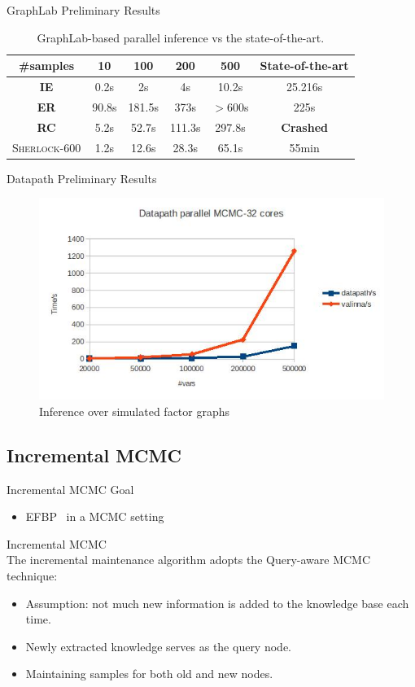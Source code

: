 \documentclass[onlymath,xcolor=pdftex,dvipsnames,table]{beamer}
\newcommand{\sherlock}{\textsc{Sherlock}\xspace}
\newcommand{\head}[1]{{\large\color{OliveGreen}#1\\[2pt]}}
\begin{document}
\begin{frame}{GraphLab Preliminary Results}
\begin{table}
  \centering
  \begin{tabular}{|cccccc|}\hline
    \textbf{\#samples} & 10 & 100 & 200 & 500 & State-of-the-art\\
    \hline
    \textbf{IE}   & 0.2s & 2s & 4s & 10.2s & 25.216s  \\
    \textbf{ER}   & 90.8s & 181.5s & 373s & $>$600s & 225s \\
    \textbf{RC}   & 5.2s & 52.7s & 111.3s & 297.8s & \textbf{\color{Red}Crashed} \\
    \sherlock-600 & 1.2s & 12.6s & 28.3s & 65.1s & 55min \\
    \hline
  \end{tabular}
  \caption{GraphLab-based parallel inference vs the state-of-the-art.}
\end{table}
\end{frame}

\begin{frame}{Datapath Preliminary Results}
\begin{figure}
  \centering
  \caption{Inference over simulated factor graphs}
  \includegraphics[width=.5\textwidth]{datapath.jpg}
\end{figure}
\end{frame}

\subsection{Incremental MCMC}
\begin{frame}{Incremental MCMC}
\head{Goal}
\vspace{-6pt}
\begin{itemize}
  \item EFBP~\cite{nath2010efficient} in a MCMC setting
\end{itemize}

\head{Incremental MCMC}
The incremental maintenance algorithm adopts the Query-aware MCMC~\cite{wick2011queryaware} technique:
\begin{itemize}
\item Assumption: not much new information is added to the knowledge base each time.
\item Newly extracted knowledge serves as the query node.
\item Maintaining samples for both old and new nodes.
\end{itemize}
\end{frame}
\end{document}

